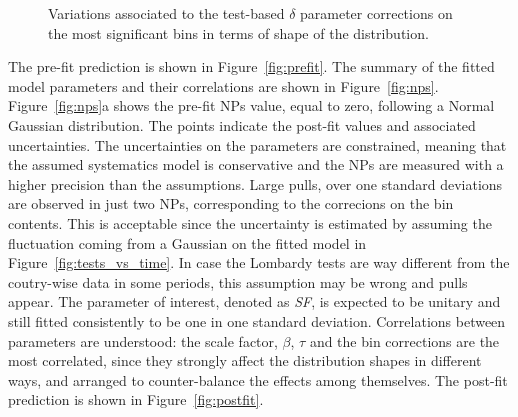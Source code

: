 \begin{figure}
\centering
{}
  \caption{Variations associated to the test-based $\delta$ parameter corrections on the most significant bins in terms of shape of the distribution.}
  \label{fig:syst_np_corrbin}
\end{figure}

The pre-fit prediction is shown in Figure~\ref{fig:prefit}. The summary of the fitted model parameters and their correlations are shown in Figure~\ref{fig:nps}. Figure~\ref{fig:nps}a shows the pre-fit NPs value, equal to zero, following a Normal Gaussian distribution. The points indicate the post-fit values and associated uncertainties. The uncertainties on the parameters are constrained, meaning that the assumed systematics model is conservative and the NPs are measured with a higher precision than the assumptions. Large pulls, over one standard deviations are observed in just two NPs, corresponding to the correcions on the bin contents. This is acceptable since the  uncertainty is estimated by assuming the fluctuation coming from a Gaussian on the fitted model in Figure~\ref{fig:tests_vs_time}. In case the Lombardy tests are way different from the coutry-wise data in some periods, this assumption may be wrong and pulls appear. The parameter of interest, denoted as \emph{SF}, is expected to be unitary and still fitted consistently to be one in one standard deviation. Correlations between parameters are understood: the scale factor, $\beta$, $\tau$ and the bin corrections are the most correlated, since they strongly affect the distribution shapes in different ways, and arranged to counter-balance the effects among themselves. The post-fit prediction is shown in Figure~\ref{fig:postfit}.

